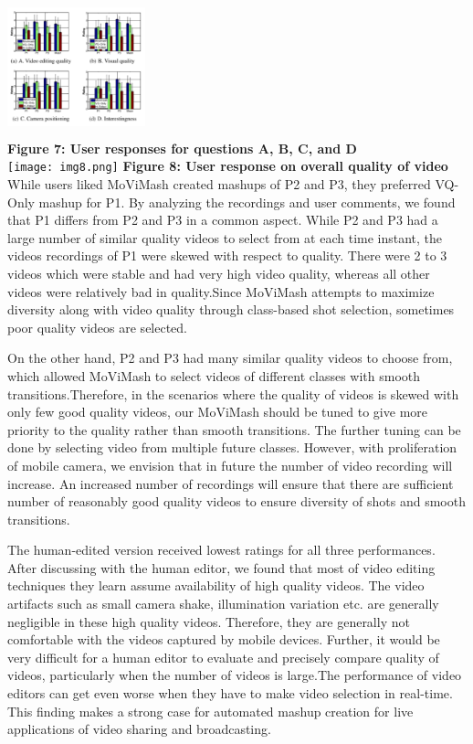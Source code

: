 \documentclass{sig-alternate}
\begin{document}
\includegraphics[width=4cm, height=4cm]{img7.png}\\
\textbf{Figure 7: User responses for questions A, B, C, and D}\\
\texttt{[image: img8.png]}
\textbf{Figure 8: User response on overall quality of video}
While users liked MoViMash created mashups of P2 and P3, they preferred VQ-Only mashup for P1. By analyzing the recordings and user comments, we found that P1 differs from P2 and P3 in a common aspect. While P2 and P3 had a large number of similar quality videos to select from at each time instant, the videos recordings of P1 were skewed with respect to quality. There were 2 to 3 videos which were stable and had very high video quality, whereas all other videos were relatively bad in quality.Since MoViMash attempts to maximize diversity along with video quality through class-based shot selection, sometimes poor quality videos are selected.

On the other hand, P2 and P3 had many similar quality videos to choose from, which allowed MoViMash to select videos of different classes with smooth transitions.Therefore, in the scenarios where the quality of videos is skewed with only few good quality videos, our MoViMash should be tuned to give more priority to
the quality rather than smooth transitions. The further tuning can be done by selecting video from multiple future classes. However, with proliferation of mobile camera, we envision that in future the number of video recording will increase. An increased number of recordings will ensure that there are sufficient number of reasonably good quality videos to ensure diversity of shots and smooth transitions.

The human-edited version received lowest ratings for all three performances. After discussing with the human editor, we found that most of video editing techniques they learn assume availability of high quality videos. The video artifacts such as small camera shake, illumination variation etc. are generally negligible in these high quality videos. Therefore, they are generally not comfortable with the videos captured by mobile devices. Further, it would be very difficult for a human editor to evaluate and precisely compare quality of videos, particularly when the number of videos is large.The performance of video editors can get even worse when they have to make video selection in real-time. This finding makes a strong case for automated mashup creation for live applications of video sharing and broadcasting.
\end{document}
